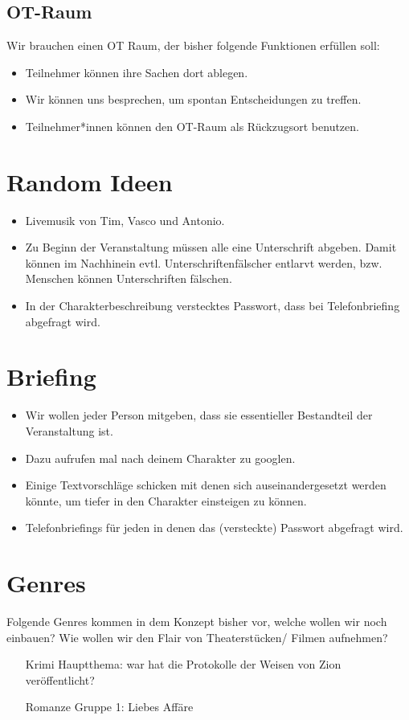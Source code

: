 \documentclass[12pt, a4paper, openany]{report}
\begin{document}
\section{OT-Raum}
Wir brauchen einen OT Raum, der bisher folgende Funktionen erfüllen soll:
\begin{itemize}
    \item Teilnehmer können ihre Sachen dort ablegen.
    \item Wir können uns besprechen, um spontan Entscheidungen zu treffen.
    \item Teilnehmer*innen können den OT-Raum als Rückzugsort benutzen. 
\end{itemize}

\chapter{Random Ideen}
\begin{itemize}
    \item Livemusik von Tim, Vasco und Antonio.
    \item Zu Beginn der Veranstaltung müssen alle eine Unterschrift abgeben. 
Damit können im Nachhinein evtl. Unterschriftenfälscher entlarvt werden, bzw. Menschen können Unterschriften fälschen.
    \item In der Charakterbeschreibung verstecktes Passwort, dass bei Telefonbriefing abgefragt wird.
\end{itemize}

\chapter{Briefing}
\begin{itemize}
    \item Wir wollen jeder Person mitgeben, dass sie essentieller Bestandteil der Veranstaltung ist.
    \item Dazu aufrufen mal nach deinem Charakter zu googlen.
    \item Einige Textvorschläge schicken mit denen sich auseinandergesetzt werden könnte, um tiefer in den Charakter einsteigen zu können.
    \item Telefonbriefings für jeden in denen das (versteckte) Passwort abgefragt wird.
\end{itemize}

\chapter{Genres}
Folgende Genres kommen in dem Konzept bisher vor, welche wollen wir noch einbauen? 
Wie wollen wir den Flair von Theaterstücken/ Filmen aufnehmen?
\begin{itemize}
    \item[Krimi] Hauptthema: war hat die Protokolle der Weisen von Zion veröffentlicht?
    \item[Romanze] Gruppe 1: Liebes Affäre 
\end{itemize}
\end{document}

